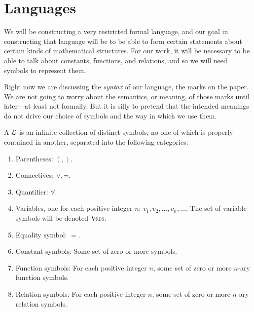 \section{Languages}\label{sec:1.2}

\begin{note}
  We will be constructing a very restricted formal language, and our goal in constructing that language will be to be able to form certain statements about certain kinds of mathematical structures.
  For our work, it will be necessary to be able to talk about constants, functions, and relations, and so we will need symbols to represent them.

  Right now we are discussing the \emph{syntax} of our language, the marks on the paper.
  We are not going to worry about the semantics, or meaning, of those marks until later---at least not formally.
  But it is silly to pretend that the intended meanings do not drive our choice of symbols and the way in which we use them.
\end{note}

\begin{defn}\label{1.2.1}
  A \textbf{} \(\mathcal{L}\) is an infinite collection of distinct symbols, no one of which is properly contained in another, separated into the following categories:
  \begin{enumerate}
    \item Parentheses:
          \((, )\).
    \item Connectives:
          \(\lor, \lnot\).
    \item Quantifier:
          \(\forall\).
    \item Variables, one for each positive integer \(n\):
          \(v_1, v_2, \dots, v_n, \dots\).
          The set of variable symbols will be denoted \(\operatorname{Vars}\).
    \item Equality symbol:
          \(=\).
    \item Constant symbols:
          Some set of zero or more symbols.
    \item Function symbols:
          For each positive integer \(n\), some set of zero or more \(n\)-ary function symbols.
    \item Relation symbols:
          For each positive integer \(n\), some set of zero or more \(n\)-ary relation symbols.
  \end{enumerate}
\end{defn}

